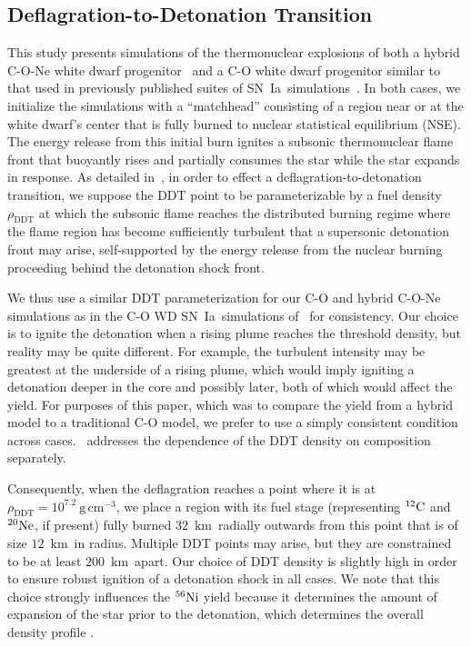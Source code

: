 \documentclass[iop,apj]{emulateapj}
\newcommand{\SNIa}{SN~Ia}
\newcommand{\C}[1]{\ensuremath{{}^{#1}{\rm C}}}
\newcommand{\Ne}[1]{\ensuremath{{}^{#1}{\rm Ne}}}
\newcommand{\Ni}[1]{\ensuremath{{}^{#1}{\rm Ni}}}
\newcommand{\unitspace}{\ensuremath{\,}}
\newcommand{\usp}{\unitspace}
\newcommand{\unitstyle}[1]{\ensuremath{\mathrm{#1}}}
\newcommand{\power}[2]{\ensuremath{{#1}^{#2}}}
\newcommand{\centi}{\unitstyle{c}}
\newcommand{\kilo}{\unitstyle{k}}
\newcommand{\meter}{\unitstyle{m}}
\newcommand{\cm}{\centi\meter}
\newcommand{\gram}{\unitstyle{g}}
\newcommand{\grampercc}{\gram\usp\power{\cm}{-3}} %
\newcommand{\km}{\kilo\meter}   %
\begin{document}
\subsection{Deflagration-to-Detonation Transition}
\label{subsec:ddt_details}
This study presents simulations of the thermonuclear explosions of
both a hybrid C-O-Ne white dwarf
progenitor~\citep{denissenkovetal2015} and a C-O white dwarf
progenitor similar to that used in previously published suites of
\SNIa\ simulations~\citep{kruegetal12}. In both cases, we initialize
the simulations with a ``matchhead'' consisting of a region near or at
the white dwarf's center that is fully burned to nuclear statistical
equilibrium (NSE). The energy release from this initial burn ignites a
subsonic thermonuclear flame front that buoyantly rises and partially
consumes the star while the star expands in response. As detailed
in~\citet{townetal2009, jacketal2010}, in order to effect a
deflagration-to-detonation transition, we suppose the DDT point to be
parameterizable by a fuel density $\rho_{\mathrm{DDT}}$ at which the
subsonic flame reaches the distributed burning regime where the flame
region has become sufficiently turbulent that a supersonic detonation
front may arise, self-supported by the energy release from the nuclear
burning proceeding behind the detonation shock front.

We thus use a similar DDT parameterization for our C-O and hybrid
C-O-Ne simulations as in the C-O WD \SNIa\ simulations
of~\citet{Krueger2010On-Variations-o, kruegetal12} for
consistency. Our choice is to ignite the detonation when a rising
plume reaches the threshold density, but reality may be quite
different. For example, the turbulent intensity may be greatest at the
underside of a rising plume, which would imply igniting a detonation
deeper in the core and possibly later, both of which would affect the
yield. For purposes of this paper, which was to compare the yield from
a hybrid model to a traditional C-O model, we prefer to use a simply
consistent condition across cases.~\citet{jacketal2010} addresses the
dependence of the DDT density on composition separately.

Consequently, when the deflagration reaches a point where it is at
$\rho_{\mathrm{DDT}} = 10^{7.2}~\grampercc$, we place a region with
its fuel stage (representing \C{12} and \Ne{20}, if present) fully
burned $32$~\km\ radially outwards from this point that is of size
$12$~\km\ in radius. Multiple DDT points may arise, but they are
constrained to be at least $200$~\km\ apart. Our choice of DDT
  density is slightly high in order to ensure robust ignition of a
  detonation shock in all cases. We note that this choice strongly
  influences the \Ni{56} yield because it determines the amount of
  expansion of the star prior to the detonation, which determines the
  overall density profile \citep{jacketal2010}.
\end{document}
